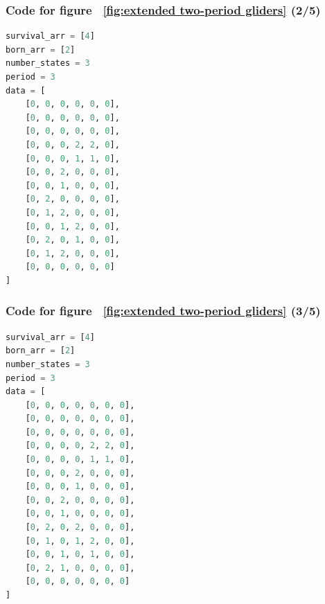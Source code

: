 \documentclass[12pt]{article}
\numberwithin{figure}{section} %
\begin{document}
\noindent\begin{minipage}{.45\textwidth}
\subsubsection{Code for figure ~\ref{fig:extended two-period gliders} (2/5)}
\label{subsubsection:extended two-period gliders(2/5)}
\begin{lstlisting}[language = Python]
survival_arr = [4]
born_arr = [2]
number_states = 3
period = 3
data = [
    [0, 0, 0, 0, 0, 0],
    [0, 0, 0, 0, 0, 0],
    [0, 0, 0, 0, 0, 0],
    [0, 0, 0, 2, 2, 0],
    [0, 0, 0, 1, 1, 0],
    [0, 0, 2, 0, 0, 0],
    [0, 0, 1, 0, 0, 0],
    [0, 2, 0, 0, 0, 0],
    [0, 1, 2, 0, 0, 0],
    [0, 0, 1, 2, 0, 0],
    [0, 2, 0, 1, 0, 0],
    [0, 1, 2, 0, 0, 0],
    [0, 0, 0, 0, 0, 0]
]
\end{lstlisting}
\end{minipage}\hfill
\begin{minipage}{.45\textwidth}
\subsubsection{Code for figure ~\ref{fig:extended two-period gliders} (3/5)}
\label{subsubsection:extended two-period gliders(3/5)}
\begin{lstlisting}[language = Python]
survival_arr = [4]
born_arr = [2]
number_states = 3
period = 3
data = [
    [0, 0, 0, 0, 0, 0, 0],
    [0, 0, 0, 0, 0, 0, 0],
    [0, 0, 0, 0, 0, 0, 0],
    [0, 0, 0, 0, 2, 2, 0],
    [0, 0, 0, 0, 1, 1, 0],
    [0, 0, 0, 2, 0, 0, 0],
    [0, 0, 0, 1, 0, 0, 0],
    [0, 0, 2, 0, 0, 0, 0],
    [0, 0, 1, 0, 0, 0, 0],
    [0, 2, 0, 2, 0, 0, 0],
    [0, 1, 0, 1, 2, 0, 0],
    [0, 0, 1, 0, 1, 0, 0],
    [0, 2, 1, 0, 0, 0, 0],
    [0, 0, 0, 0, 0, 0, 0]
]
\end{lstlisting}
\end{minipage}
\end{document}
